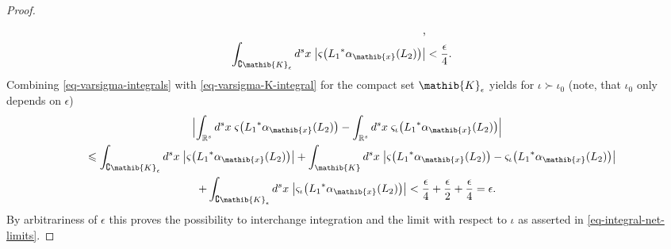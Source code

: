 \documentclass[11pt,twoside,openright]{report}
\theoremstyle{definition}
\theoremstyle{plain}
\theoremstyle{remark}
\theoremstyle{assumption}
\newcommand{\babs}[1]{\bigl\lvert #1 \bigr\rvert}
\newcommand{\Babs}[1]{\Bigl\lvert #1 \Bigr\rvert}
\newcommand{\Kib}{\mathib{K}}
\newcommand{\Rs}{\mathbb{R}^s}
\newcommand{\aibx}{\alpha_\mathib{x}}
\begin{document}
\begin{proof}
\begin{subequations}
\begin{align}
      \text{,} \\
      \label{eq-varsigma-int-2}
      \int_{\complement \Kib_\epsilon} d^s x \; \babs{\varsigma \bigl(
      {L_1}^* \aibx ( L_2 ) \bigr)} & < \frac{\epsilon}{4} \text{.}
    \end{align}
  \end{subequations}
  Combining \eqref{eq-varsigma-integrals} with
  \eqref{eq-varsigma-K-integral} for the compact set $\Kib_\epsilon$
  yields for $\iota \succ \iota_0$ (note, that $\iota_0$ only depends
  on $\epsilon$)
  \begin{multline*}
    \Babs{\int_{\Rs} d^s x \; \varsigma \bigl( {L_1}^* \aibx ( L_2 )
    \bigr) - \int_{\Rs} d^s x \; \varsigma_\iota \bigl( {L_1}^* \aibx
    ( L_2 ) \bigr)} \\
    \shoveleft{\leqslant \int_{\complement \Kib_\epsilon} d^s x \;
    \babs{\varsigma \bigl( {L_1}^* \aibx ( L_2 ) \bigr)} + \int_\Kib
    d^s x \; \babs{\varsigma \bigl( {L_1}^* \aibx ( L_2 ) \bigr) -
    \varsigma_\iota \bigl( {L_1}^* \aibx ( L_2 ) \bigr)}} \\
    + \int_{\complement \Kib_\epsilon} d^s x \; \babs{\varsigma_\iota
    \bigl( {L_1}^* \aibx ( L_2 ) \bigr)} < \frac{\epsilon}{4} +
    \frac{\epsilon}{2} + \frac{\epsilon}{4} = \epsilon \text{.}
  \end{multline*}
  By arbitrariness of $\epsilon$ this proves the possibility to
  interchange integration and the limit with respect to $\iota$ as
  asserted in \eqref{eq-integral-net-limits}.
\end{proof}
\end{document}
